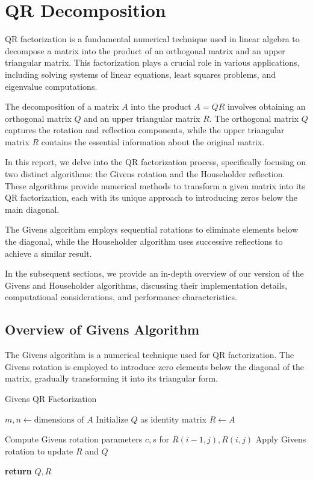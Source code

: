 \documentclass{article}
\begin{document}
\section{QR Decomposition}

QR factorization is a fundamental numerical technique used in linear algebra to decompose a matrix into the product of an orthogonal matrix and an upper triangular matrix. This factorization plays a crucial role in various applications, including solving systems of linear equations, least squares problems, and eigenvalue computations.

The decomposition of a matrix $A$ into the product $A = QR$ involves obtaining an orthogonal matrix $Q$ and an upper triangular matrix $R$. The orthogonal matrix $Q$ captures the rotation and reflection components, while the upper triangular matrix $R$ contains the essential information about the original matrix.

In this report, we delve into the QR factorization process, specifically focusing on two distinct algorithms: the Givens rotation and the Householder reflection. These algorithms provide numerical methods to transform a given matrix into its QR factorization, each with its unique approach to introducing zeros below the main diagonal.

The Givens algorithm employs sequential rotations to eliminate elements below the diagonal, while the Householder algorithm uses successive reflections to achieve a similar result.

In the subsequent sections, we provide an in-depth overview of our version of the Givens and Householder algorithms, discussing their implementation details, computational considerations, and performance characteristics.


\subsection{Overview of Givens Algorithm}

The Givens algorithm is a numerical technique used for QR factorization. The Givens rotation is employed to introduce zero elements below the diagonal of the matrix, gradually transforming it into its triangular form.
\begin{algorithm}
\caption{Givens QR Factorization}
\begin{algorithmic}[1]
    \State $m, n \gets \text{dimensions of } A$
    \State Initialize $Q$ as identity matrix
    \State $R \gets A$
    
            \State Compute Givens rotation parameters $c, s$ for $R(i-1, j), R(i, j)$
            \State Apply Givens rotation to update $R$ and $Q$
        \EndFor
    \EndFor
    
    \State \textbf{return} $Q, R$
\EndProcedure
\end{algorithmic}
\end{algorithm}
\end{document}
